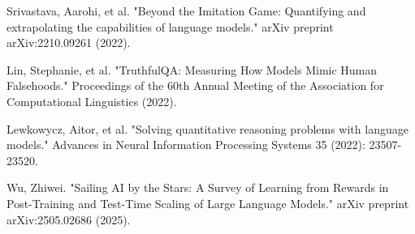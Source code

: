 Srivastava, Aarohi, et al. "Beyond the Imitation Game: Quantifying and extrapolating the capabilities of language models." arXiv preprint arXiv:2210.09261 (2022).

Lin, Stephanie, et al. "TruthfulQA: Measuring How Models Mimic Human Falsehoods." Proceedings of the 60th Annual Meeting of the Association for Computational Linguistics (2022).

Lewkowycz, Aitor, et al. "Solving quantitative reasoning problems with language models." Advances in Neural Information Processing Systems 35 (2022): 23507-23520.

Wu, Zhiwei. "Sailing AI by the Stars: A Survey of Learning from Rewards in Post-Training and Test-Time Scaling of Large Language Models." arXiv preprint arXiv:2505.02686 (2025).
